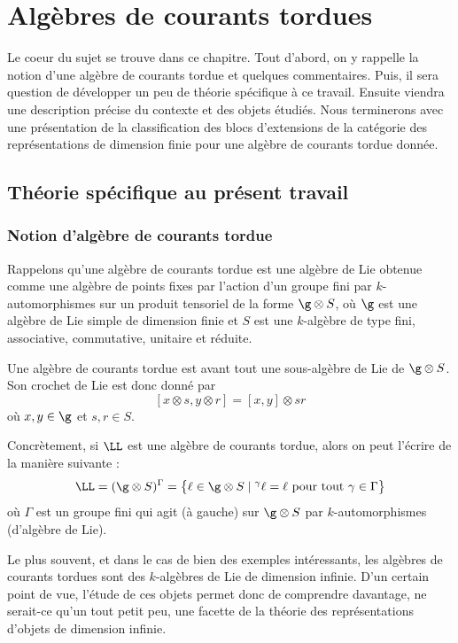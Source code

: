 \chapter{Algèbres de courants tordues}     %

Le coeur du sujet se trouve dans ce chapitre. Tout d'abord, on y rappelle la notion d'une algèbre de courants tordue et quelques commentaires. Puis, il sera question de développer un peu de théorie spécifique à ce travail. Ensuite viendra une description précise du contexte et des objets étudiés. Nous terminerons avec une présentation de la classification des blocs d'extensions de la catégorie des représentations de dimension finie pour une algèbre de courants tordue donnée.

\section{Théorie spécifique au présent travail}
%
\subsection{Notion d'algèbre de courants tordue}


Rappelons qu'une algèbre de courants tordue est une algèbre de Lie obtenue comme une algèbre de points fixes par l'action d'un groupe fini par $k$-automorphismes sur un produit tensoriel de la forme $\g \otimes S$, où $\g$ est une algèbre de Lie simple de dimension finie et $S$ est une $k$-algèbre de type fini, associative, commutative, unitaire et réduite.

Une algèbre de courants tordue est avant tout une sous-algèbre de Lie de $\g \otimes S$. Son crochet de Lie est donc donné par
\begin{equation} \label{crochetL}
[x \otimes s, y \otimes r] = [x,y] \otimes sr
\end{equation}
où $x,y \in \g$ et $s,r \in S$.

Concrètement, si $\LL$ est une algèbre de courants tordue, alors on peut l'écrire de la manière suivante : 
$$ \LL = (\g \otimes S)^\Gamma = \big\{ \ell \in \g \otimes S \; | \; {}^\gamma\ell = \ell \text{ pour tout } \gamma \in \Gamma\big\} $$
où $\Gamma$ est un groupe fini qui agit (à gauche) sur $\g \otimes S$ par $k$-automorphismes (d'algèbre de Lie).

\begin{Rem} \label{Linfinie} Le plus souvent, et dans le cas de bien des exemples intéressants, les algèbres de courants tordues sont des $k$-algèbres de Lie de dimension infinie. D'un certain point de vue, l'étude de ces objets permet donc de comprendre davantage, ne serait-ce qu'un tout petit peu, une facette de la théorie des représentations d'objets de dimension infinie.
\end{Rem}

